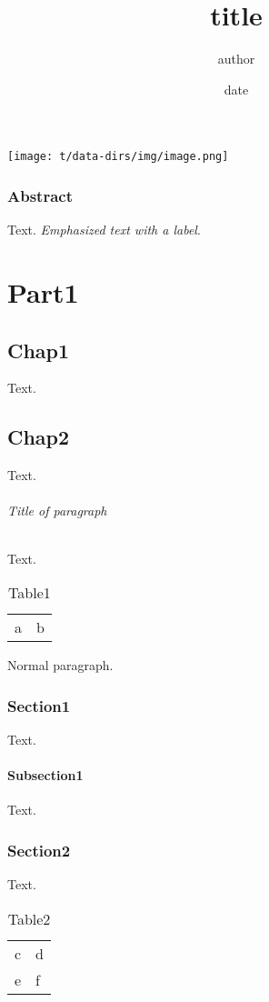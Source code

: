 \documentclass[a4paper,11pt]{book}
\title{title}
\author{author}
\date{date}
\begin{document}
\maketitle
\setcounter{tocdepth}{0}
\tableofcontents
\texttt{[image: t/data-dirs/img/image.png]}

\section*{Abstract}
\label{s:1}
Text.
\hypertarget{label1}{\emph{Emphasized text with a label}}.

\part{Part1}
\label{s:2}
\setcounter{tocdepth}{0}
\minitoc
\chapter{Chap1}
\label{s:3}
Text.

\chapter{Chap2}
\label{s:4}
\setcounter{tocdepth}{3}
\minitoc
Text.

\paragraph{Title of paragraph}
Text.
\begin{table}[htbp]
\begin{tabular}{ll}
a
 & b
 \\
\end{tabular}
\caption{Table1}
\label{tbl:1}
\end{table}

Normal paragraph.

\section{Section1}
\label{s:5}
Text.

\subsection{Subsection1}
\label{s:6}
Text.

\section{Section2}
\label{s:7}
Text.
\begin{table}[htbp]
\begin{tabular}{ll}
c
 & d
 \\
e
 & f
 \\
\end{tabular}
\caption{Table2}
\label{tbl:2}
\end{table}
\end{document}
